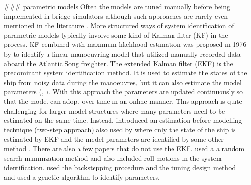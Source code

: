 ### parametric models
Often the models are tuned manually before being implemented in bridge simulators although such approaches are rarely even mentioned in the literature \cite{sutuloAlgorithmOfflineIdentification2014}. More structured ways of system identification of parametric models typically involve some kind of Kalman filter (KF) in the process. KF combined with maximum likelihood estimation was proposed in 1976 by \cite{astromIdentificationShipSteering1976} to identify a linear manoeuvring model that utilized manually recorded data aboard the Atlantic Song freighter. The extended Kalman filter (EKF) is the predominant system identification method. It is used to estimate the states of the ship from noisy data during the manoeuvres, but it can also estimate the model parameters (\cite{shiIdentificationShipManeuvering2009}, \cite{pereraSystemIdentificationNonlinear2015}). With this approach the parameters are updated continuously so that the model can adopt over time in an online manner. This approach is quite challenging for larger model structures where many parameters need to be estimated on the same time. Instead, \cite{yoonIdentificationHydrodynamicCoefficients2003} introduced an estimation before modelling technique  (two-step approach) also used by \cite{revestidoherreroTwostepIdentificationNonlinear2012} where only the state of the ship is estimated by EKF and the model parameters are identified by some other method .  
There are also a few papers that do not use the EKF. \cite{tianoMultivariableIdentificationShip1997} used a a random search minimization method and also included roll motions in the system identification. \cite{casadoIdentificationNonlinearShip2005} used the backstepping procedure and the tuning design method and \cite{millerShipModelIdentification2021} used a genetic algorithm   to identify parameters.

